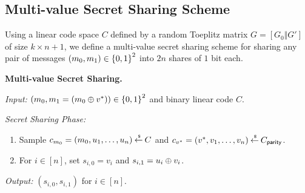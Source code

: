 \subsection{Multi-value Secret Sharing Scheme}
Using a linear code space $C$ defined by a random Toeplitz matrix $G = [G_0\Vert G']$ of size $k \times n+1$, we define a multi-value secret sharing scheme for sharing any pair of messages $(m_0,m_1) \in {\{0,1\}}^2$ into $2n$ shares of $1$ bit each.

\begin{boxedalgo}
	\textbf{Multi-value Secret Sharing.}
	
	\textit{Input:} $(m_0,m_1 = (m_0 \oplus v^*)) \in {\{0,1\}}^2$ and binary linear code $C$.
	
	\textit{Secret Sharing Phase:}
	\begin{enumerate}
		\item Sample $c_{m_0} = (m_0,u_1,\dotsc,u_n) \mathbin{\stackrel{\mbox{\,\tiny \$}}{\gets}} C$ and $c_{v^*} = (v^*, v_1,\dotsc, v_n) \mathbin{\stackrel{\mbox{\,\tiny \$}}{\gets}} C_{\mathsf{parity}}$.
		\item For $i \in [n]$, set $s_{i,0} = v_i$ and $s_{i,1} = u_i \oplus v_i$.
	\end{enumerate}
	
	\textit{Output:} $(s_{i,0}, s_{i,1})$ for $i \in [n]$.
\end{boxedalgo}

